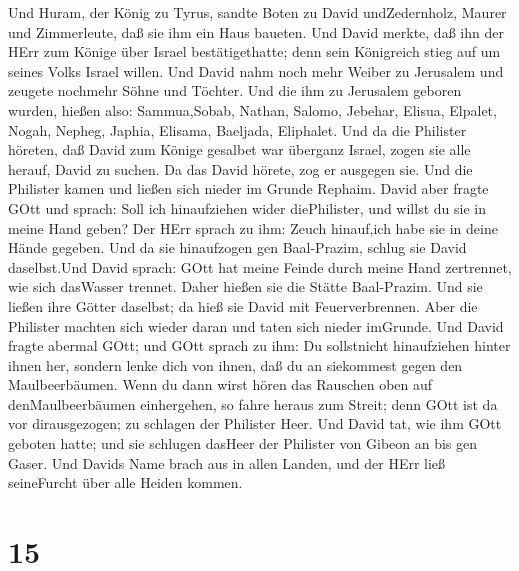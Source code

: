  Und Huram, der König zu Tyrus, sandte Boten zu David
undZedernholz, Maurer und Zimmerleute, daß sie ihm ein Haus baueten.
 Und David merkte, daß ihn der HErr zum Könige über Israel
bestätigethatte; denn sein Königreich stieg auf um seines Volks Israel
willen.  Und David nahm noch mehr Weiber zu Jerusalem und
zeugete nochmehr Söhne und Töchter.  Und die ihm zu
Jerusalem geboren wurden, hießen also: Sammua,Sobab, Nathan, Salomo,
 Jebehar, Elisua, Elpalet,  Nogah, Nepheg,
Japhia,  Elisama, Baeljada, Eliphalet.  Und da
die Philister höreten, daß David zum Könige gesalbet war überganz
Israel, zogen sie alle herauf, David zu suchen. Da das David hörete, zog
er ausgegen sie.  Und die Philister kamen und ließen sich
nieder im Grunde Rephaim.  David aber fragte GOtt und
sprach: Soll ich hinaufziehen wider diePhilister, und willst du sie in
meine Hand geben? Der HErr sprach zu ihm: Zeuch hinauf,ich habe sie in
deine Hände gegeben.  Und da sie hinaufzogen gen
Baal-Prazim, schlug sie David daselbst.Und David sprach: GOtt hat meine
Feinde durch meine Hand zertrennet, wie sich dasWasser trennet. Daher
hießen sie die Stätte Baal-Prazim.  Und sie ließen ihre
Götter daselbst; da hieß sie David mit Feuerverbrennen. 
Aber die Philister machten sich wieder daran und taten sich nieder
imGrunde.  Und David fragte abermal GOtt; und GOtt sprach
zu ihm: Du sollstnicht hinaufziehen hinter ihnen her, sondern lenke dich
von ihnen, daß du an siekommest gegen den Maulbeerbäumen. 
Wenn du dann wirst hören das Rauschen oben auf denMaulbeerbäumen
einhergehen, so fahre heraus zum Streit; denn GOtt ist da vor
dirausgezogen; zu schlagen der Philister Heer.  Und David
tat, wie ihm GOtt geboten hatte; und sie schlugen dasHeer der Philister
von Gibeon an bis gen Gaser.  Und Davids Name brach aus in
allen Landen, und der HErr ließ seineFurcht über alle Heiden kommen.

\hypertarget{section-14}{%
\section{15}\label{section-14}}

